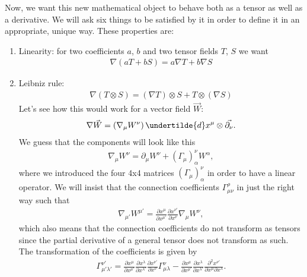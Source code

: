 \documentclass[10pt]{article}
\begin{document}
    Now, we want this new mathematical object to behave both as a tensor as well as a derivative. We will ask six things to be satisfied by it in order to define it in an appropriate, unique way. These properties are:
    \begin{enumerate}
        \item Linearity: for two coefficients $a$, $b$ and two tensor fields $T$, $S$ we want 
        \begin{align}
            \nabla(a T + b S) = a \nabla T + b \nabla S
        \end{align}
        
        \item Leibniz rule: 
        \begin{align}
            \nabla (T \otimes S) = (\nabla T) \otimes S + T \otimes (\nabla S)
        \end{align}
        Let's see how this would work for a vector field $\vec{W}$:
        \begin{align}
            \nabla \vec{W} = \left(\nabla_{\mu} W^{\nu} \right) \undertilde{d} x^{\mu} \otimes \vec{\partial_{\nu}}.
        \end{align}
        We guess that the components will look like this
        \begin{align}
            \nabla_{\mu} W^{\nu} = \partial_{\mu} W^{\nu} + \left( \Gamma_{\mu} \right)^{\nu}_{\alpha} W^{\alpha},
        \end{align}
        where we introduced the four 4x4 matrices $\left( \Gamma_{\mu} \right)^{\nu}_{\alpha}$ in order to have a linear operator. We will insist that the connection coefficients $\Gamma_{\mu \nu}^{\rho}$ in just the right way such that
        \begin{align}
            \nabla_{\mu'} W^{\mu'} = \frac{\partial x^{\mu}}{\partial x^{\mu'}} \frac{\partial x^{\nu'}}{\partial x^{\nu}} \nabla_{\mu} W^{\nu},
        \end{align}
        which also means that the connection coefficients do not transform as tensors since the partial derivative of a general tensor does not transform as such. The transformation of the coefficients is given by
        \begin{align}
            \Gamma_{\mu' \lambda'}^{\nu'} = \frac{\partial x^{\mu}}{\partial x^{\mu'}} \frac{\partial x^{\lambda}}{\partial x^{\lambda'}} \frac{\partial x^{\nu'}}{\partial x^{\nu}} \Gamma_{\mu \lambda}^{\nu} - \frac{\partial x^{\mu}}{\partial x^{\mu'}} \frac{\partial x^{\lambda}}{\partial x^{\lambda'}} \frac{\partial^2 x^{\nu'}}{\partial x^{\mu} \partial x^{\lambda}}.
        \end{align}
        

\end{enumerate}
\end{document}
